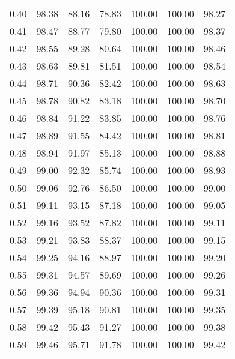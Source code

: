 \begin{tabular}{|c|c|c|c|c|c|c|}
      0.40 &     98.38 &     88.16 &      78.83 &  100.00 &     100.00 &         98.27 \\
      0.41 &     98.47 &     88.77 &      79.80 &  100.00 &     100.00 &         98.37 \\
      0.42 &     98.55 &     89.28 &      80.64 &  100.00 &     100.00 &         98.46 \\
      0.43 &     98.63 &     89.81 &      81.51 &  100.00 &     100.00 &         98.54 \\
      0.44 &     98.71 &     90.36 &      82.42 &  100.00 &     100.00 &         98.63 \\
      0.45 &     98.78 &     90.82 &      83.18 &  100.00 &     100.00 &         98.70 \\
      0.46 &     98.84 &     91.22 &      83.85 &  100.00 &     100.00 &         98.76 \\
      0.47 &     98.89 &     91.55 &      84.42 &  100.00 &     100.00 &         98.81 \\
      0.48 &     98.94 &     91.97 &      85.13 &  100.00 &     100.00 &         98.88 \\
      0.49 &     99.00 &     92.32 &      85.74 &  100.00 &     100.00 &         98.93 \\
      0.50 &     99.06 &     92.76 &      86.50 &  100.00 &     100.00 &         99.00 \\
      0.51 &     99.11 &     93.15 &      87.18 &  100.00 &     100.00 &         99.05 \\
      0.52 &     99.16 &     93.52 &      87.82 &  100.00 &     100.00 &         99.11 \\
      0.53 &     99.21 &     93.83 &      88.37 &  100.00 &     100.00 &         99.15 \\
      0.54 &     99.25 &     94.16 &      88.97 &  100.00 &     100.00 &         99.20 \\
      0.55 &     99.31 &     94.57 &      89.69 &  100.00 &     100.00 &         99.26 \\
      0.56 &     99.36 &     94.94 &      90.36 &  100.00 &     100.00 &         99.31 \\
      0.57 &     99.39 &     95.18 &      90.81 &  100.00 &     100.00 &         99.35 \\
      0.58 &     99.42 &     95.43 &      91.27 &  100.00 &     100.00 &         99.38 \\
      0.59 &     99.46 &     95.71 &      91.78 &  100.00 &     100.00 &         99.42 \\

\end{tabular}
